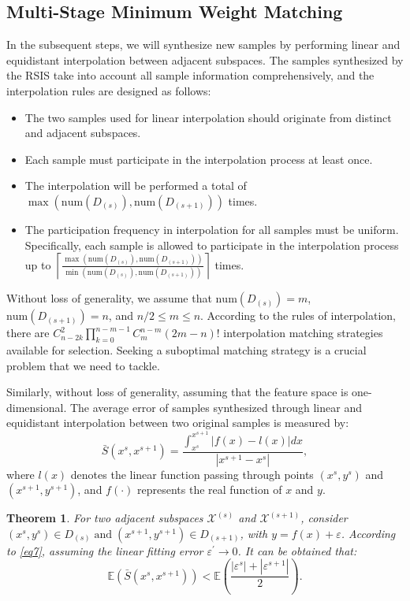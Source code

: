 \documentclass[lettersize,journal]{IEEEtran}
\newtheorem{theorem}{Theorem}
\begin{document}
\subsection{Multi-Stage Minimum Weight Matching}
In the subsequent steps, we will synthesize new samples by 
performing linear and equidistant interpolation between adjacent 
subspaces. The samples synthesized by the RSIS take into account 
all sample information comprehensively, and the interpolation 
rules are designed as follows:

\begin{itemize}
  \item The two samples used for linear interpolation should 
  originate from distinct and adjacent subspaces.
  \item Each sample must participate in the interpolation 
  process at least once.
  \item The interpolation will be performed a total of 
  $\max(\text{num}{(D_{(s)}),\text{num}(D_{(s+1)})})$ times.
  \item The participation frequency in interpolation for all 
  samples must be uniform. Specifically, each sample is allowed 
  to participate in the interpolation process up to 
  $\left\lceil \frac{\max(\text{num}{(D_{(s)}),
  \text{num}(D_{(s+1)})})}{\min(\text{num}{(D_{(s)}),
  \text{num}(D_{(s+1)})})}\right\rceil$ times.
\end{itemize}

Without loss of generality, we 
assume that $\text{num}(D_{(s)})=m$, $\text{num}(D_{(s+1)})=n$, 
and $n/2\le m \le n$. According to the rules of interpolation, 
there are $C_{n-2k}^{2}\prod_{k=0}^{n-m-1} C_{m}^{n-m}(2m-n)!$ 
interpolation matching strategies available for selection. 
Seeking a suboptimal matching strategy is a crucial problem 
that we need to tackle.

Similarly, without loss of generality, assuming that the feature 
space is one-dimensional. The average error of samples synthesized 
through linear and equidistant interpolation between two original 
samples is measured by:
\begin{equation} 
\label{eq12}
\bar{S}(x^s,x^{s+1})=\frac{\int_{x^s}^{x^{s+1}}|f(x)-l(x)|  dx}
{|x^{s+1}-x^s|}, 
\end{equation}
where $l(x)$ denotes the linear function passing through points 
$(x^s,y^s)$ and $(x^{s+1},y^{s+1})$, and $f(\cdot)$ represents
 the real function of $x$ and $y$. 

\begin{theorem}
\label{the2}
For two adjacent subspaces $\mathcal{X}^{(s)}$ and $\mathcal{X}^{(s+1)}$, 
consider $(x^s,y^s)\in D_{(s)}\;\text{and}\; (x^{s+1},y^{s+1})
\in D_{(s+1)}$, with $y=f(x)+\varepsilon$. According to \eqref{eq7}, 
assuming the linear fitting error $\varepsilon^\prime\rightarrow0$. 
It can be obtained that:
\begin{equation}
\label{eq13}
\mathbb{E} (\bar{S}(x^s,x^{s+1}))< \mathbb{E}(\frac{|\varepsilon^s|
+|\varepsilon^{s+1}|}{2}).
\end{equation}
\end{theorem}
\end{document}
